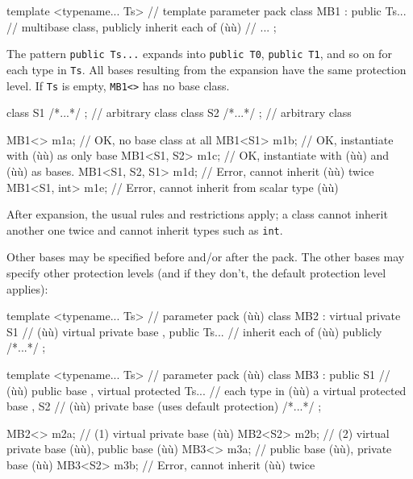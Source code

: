 \begin{emcppslisting}[emcppsbatch=e28]
template <typename... Ts>  // template parameter pack
class MB1 : public Ts...   // multibase class, publicly inherit each of (ù{}ù)
{
    // ...
};
\end{emcppslisting}
    

\noindent The pattern \lstinline!public!~\lstinline!Ts...! expands into
\lstinline!public!~\lstinline!T0!, \lstinline!public!~\lstinline!T1!, and so on for
each type in \lstinline!Ts!. All bases resulting from the expansion have
the same protection level. If \lstinline!Ts! is empty, \lstinline!MB1<>! has
no base class.

\begin{emcppslisting}[emcppsbatch=e28]
class S1 { /*...*/ };  // arbitrary class
class S2 { /*...*/ };  // arbitrary class

MB1<>           m1a;     // OK, no base class at all
MB1<S1>         m1b;     // OK, instantiate with (ù{}ù) as only base
MB1<S1, S2>     m1c;     // OK, instantiate with (ù{}ù) and (ù{}ù) as bases.
MB1<S1, S2, S1> m1d;     // Error, cannot inherit (ù{}ù) twice
MB1<S1, int>    m1e;     // Error, cannot inherit from scalar type (ù{}ù)
\end{emcppslisting}
    

\noindent After expansion, the usual rules and restrictions apply; a class cannot
inherit another one twice and cannot inherit types such as \lstinline!int!.

Other bases may be specified before and/or after the pack. The other
bases may specify other protection levels (and if they don't, the
default protection level applies):

\begin{emcppslisting}[emcppsbatch=e28]
template <typename... Ts>      // parameter pack (ù{}ù)
class MB2
    : virtual private S1       // (ù{}ù) virtual private base
    , public Ts...             // inherit each of (ù{}ù) publicly
{ /*...*/ };

template <typename... Ts>      // parameter pack (ù{}ù)
class MB3
    : public S1                // (ù{}ù) public base
    , virtual protected Ts...  // each type in (ù{}ù) a virtual protected base
    , S2                       // (ù{}ù) private base (uses default protection)
{ /*...*/ };

MB2<>   m2a;                   // (1) virtual private base (ù{}ù)
MB2<S2> m2b;                   // (2) virtual private base (ù{}ù), public base (ù{}ù)
MB3<>   m3a;                   // public base (ù{}ù), private base (ù{}ù)
MB3<S2> m3b;                   // Error, cannot inherit (ù{}ù) twice
\end{emcppslisting}
    

